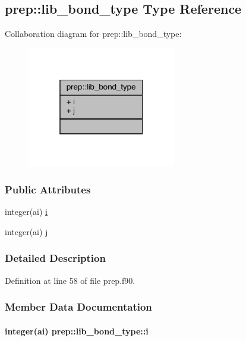 \hypertarget{structprep_1_1lib__bond__type}{\subsection{prep\-:\-:lib\-\_\-bond\-\_\-type Type Reference}
\label{structprep_1_1lib__bond__type}
}


Collaboration diagram for prep\-:\-:lib\-\_\-bond\-\_\-type\-:
\nopagebreak
\begin{figure}[H]
\begin{center}
\leavevmode
\includegraphics[width=184pt]{structprep_1_1lib__bond__type__coll__graph}
\end{center}
\end{figure}
\subsubsection*{Public Attributes}
\begin{DoxyCompactItemize}
\item 
integer(ai) \hyperlink{structprep_1_1lib__bond__type_a2663188e1af4a1235d9b46dc76097704}{i}
\item 
integer(ai) \hyperlink{structprep_1_1lib__bond__type_abcfefae0750b1d9c3632e460e99c8bcb}{j}
\end{DoxyCompactItemize}


\subsubsection{Detailed Description}


Definition at line 58 of file prep.\-f90.



\subsubsection{Member Data Documentation}
\hypertarget{structprep_1_1lib__bond__type_a2663188e1af4a1235d9b46dc76097704}{
\paragraph[{i}]{\setlength{\rightskip}{0pt plus 5cm}integer(ai) prep\-::lib\-\_\-bond\-\_\-type\-::i}}\label{structprep_1_1lib__bond__type_a2663188e1af4a1235d9b46dc76097704}


